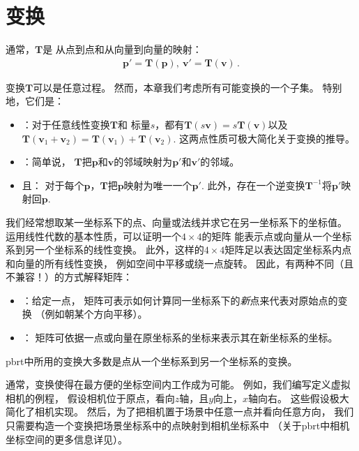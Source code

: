 \section{变换}\label{sec:变换}

通常，$\bm T$是
从点到点和从向量到向量的映射：
\begin{align*}
    \bm p'=\bm T(\bm p), \  \bm v'=\bm T(\bm v)\, .
\end{align*}

变换$\bm T$可以是任意过程。
然而，本章我们考虑所有可能变换的一个子集。
特别地，它们是：
\begin{itemize}
    \item {}：对于任意线性变换$\bm T$和
          标量$s$，都有$\bm T(s\bm v)=s\bm T(\bm v)$以及
          $\bm T(\bm v_1+\bm v_2)=\bm T(\bm v_1)+\bm T(\bm v_2)$.
          这两点性质可极大简化关于变换的推导。
    \item {}：简单说，
          $\bm T$把$\bm p$和$\bm v$的邻域映射为$\bm p'$和$\bm v'$的邻域。
    \item {}且：
          对于每个$\bm p$，$\bm T$把$\bm p$映射为唯一一个$\bm p'$.
          此外，存在一个逆变换$\bm T^{-1}$将$\bm p'$映射回$\bm p$.
\end{itemize}

我们经常想取某一坐标系下的点、向量或法线并求它在另一坐标系下的坐标值。
运用线性代数的基本性质，可以证明一个$4\times4$的矩阵
能表示点或向量从一个坐标系到另一个坐标系的线性变换。
此外，这样的$4\times4$矩阵足以表达固定坐标系内点和向量的所有线性变换，
例如空间中平移或绕一点旋转。
因此，有两种不同（且不兼容！）的方式解释矩阵：
\begin{itemize}
    \item {}：给定一点，
          矩阵可表示如何计算同一坐标系下的\emph{新}点来代表对原始点的变换
          （例如朝某个方向平移）。
    \item {}：
          矩阵可依据一点或向量在原坐标系的坐标来表示其在新坐标系的坐标。
\end{itemize}

pbrt中所用的变换大多数是点从一个坐标系到另一个坐标系的变换。

通常，变换使得在最方便的坐标空间内工作成为可能。
例如，我们编写定义虚拟相机的例程，
假设相机位于原点，看向$z$轴，且$y$向上，$x$轴向右。
这些假设极大简化了相机实现。
然后，为了把相机置于场景中任意一点并看向任意方向，
我们只需要构造一个变换把场景坐标系中的点映射到相机坐标系中
（关于pbrt中相机坐标空间的更多信息详见）。


